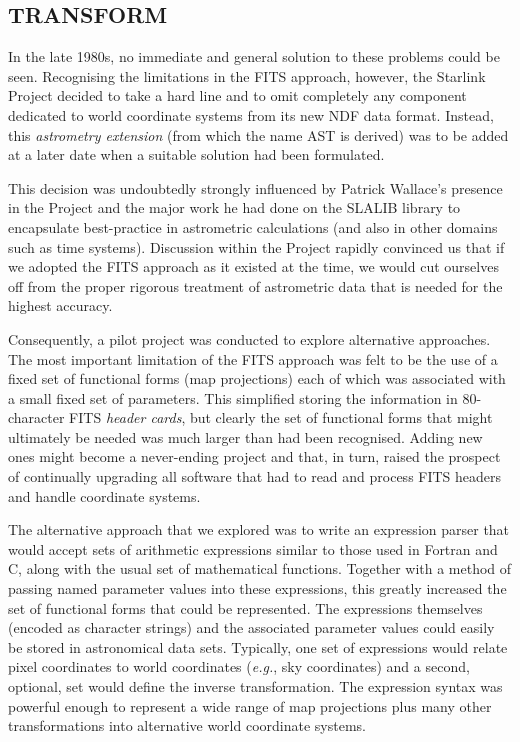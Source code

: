 \documentclass[final,authoryear,5p,times,twocolumn]{elsarticle}
\begin{document}
\subsection{TRANSFORM}

In the late 1980s, no immediate and general solution to these problems
could be seen. Recognising the limitations in the FITS approach,
however, the Starlink Project decided to take a hard line and to omit
completely any component dedicated to world coordinate systems from
its new NDF data format. Instead, this \emph{astrometry extension}
(from which the name AST is derived) was to be added at a later date
when a suitable solution had been formulated.

This decision was undoubtedly strongly influenced by Patrick Wallace's
presence in the Project and the major work he had done on the SLALIB
library \citep[][]{1994ASPC...61..481W} to encapsulate best-practice in
astrometric calculations (and also in other domains such as time
systems). Discussion within the Project rapidly convinced us that if
we adopted the FITS approach as it existed at the time, we would cut
ourselves off from the proper rigorous treatment of astrometric data
that is needed for the highest accuracy.

Consequently, a pilot project was conducted to explore alternative
approaches. The most important limitation of the FITS approach was felt
to be the use of a fixed set of functional forms (map projections) each
of which was associated with a small fixed set of parameters. This
simplified storing the information in 80-character FITS \emph{header cards},
but clearly the set of functional forms that might ultimately be needed
was much larger than had been recognised. Adding new ones might become a
never-ending project and that, in turn, raised the prospect of
continually upgrading all software that had to read and process FITS
headers and handle coordinate systems.

The alternative approach that we explored was to write an expression
parser that would accept sets of arithmetic expressions similar to those
used in Fortran and C, along with the usual set of mathematical
functions. Together with a method of passing named parameter values into
these expressions, this greatly increased the set of functional forms
that could be represented. The expressions themselves (encoded as
character strings) and the associated parameter values could easily be
stored in astronomical data sets. Typically, one set of expressions would
relate pixel coordinates to world coordinates (\emph{e.g.}, sky coordinates) and
a second, optional, set would define the inverse transformation. The
expression syntax was powerful enough to represent a wide range of map
projections plus many other transformations into alternative world
coordinate systems.
\end{document}
